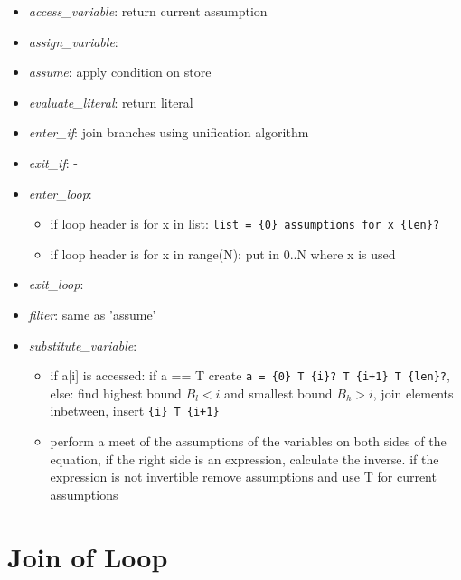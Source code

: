 \documentclass[11pt]{article}
\begin{document}
\begin{itemize}
\item \textit{access\_variable}: return current assumption
\item \textit{assign\_variable}:
\item \textit{assume}: apply condition on store
\item \textit{evaluate\_literal}: return literal
\item \textit{enter\_if}: join branches using unification algorithm
\item \textit{exit\_if}: -
\item \textit{enter\_loop}:
\begin{itemize}
\item if loop header is for x in list: \verb|list = {0} assumptions for x {len}?|
\item if loop header is for x in range(N): put in 0..N where x is used
\end{itemize}
\item \textit{exit\_loop}:
\item \textit{filter}: same as 'assume'
\item \textit{substitute\_variable}:
\begin{itemize}
\item if a[i] is accessed: if a == T create \verb|a = {0} T {i}? T {i+1} T {len}?|, else: find highest bound $B_l < i$ and smallest bound $B_h > i$, join elements inbetween, insert \verb|{i} T {i+1}|
\item perform a meet of the assumptions of the variables on both sides of the equation, if the right side is an expression, calculate the inverse. if the expression is not invertible remove assumptions and use T for current assumptions
\end{itemize}
\end{itemize}

\section{Join of Loop}
\end{document}
